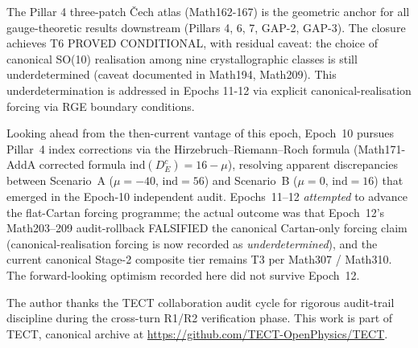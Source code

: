 The Pillar 4 three-patch Čech atlas (Math162-167) is the geometric anchor for all
gauge-theoretic results downstream (Pillars 4, 6, 7, GAP-2, GAP-3). The closure
achieves T6 PROVED CONDITIONAL, with residual caveat: the choice of canonical
SO(10) realisation among nine crystallographic classes is still underdetermined
(caveat documented in Math194, Math209). This underdetermination is addressed in
Epochs 11-12 via explicit canonical-realisation forcing via RGE boundary conditions.

Looking ahead from the then-current vantage of this epoch, Epoch~10
pursues Pillar~4 index corrections via the
Hirzebruch--Riemann--Roch formula (Math171-AddA corrected formula
$\mathrm{ind}(D_E^c) = 16 - \mu$), resolving apparent discrepancies
between Scenario~A ($\mu = -40$, $\mathrm{ind} = 56$) and Scenario~B
($\mu = 0$, $\mathrm{ind} = 16$) that emerged in the Epoch-10
independent audit. Epochs~11--12 \emph{attempted} to advance the
flat-Cartan forcing programme; the actual outcome was that Epoch~12's
Math203--209 audit-rollback FALSIFIED the canonical Cartan-only
forcing claim (canonical-realisation forcing is now recorded as
\emph{underdetermined}), and the current canonical Stage-2 composite
tier remains T3 per Math307 / Math310. The forward-looking optimism
recorded here did not survive Epoch~12.

\begin{acknowledgments}
The author thanks the TECT collaboration audit cycle for rigorous
audit-trail discipline during the cross-turn R1/R2 verification phase. This
work is part of TECT, canonical archive at
\url{https://github.com/TECT-OpenPhysics/TECT}.
\end{acknowledgments}





